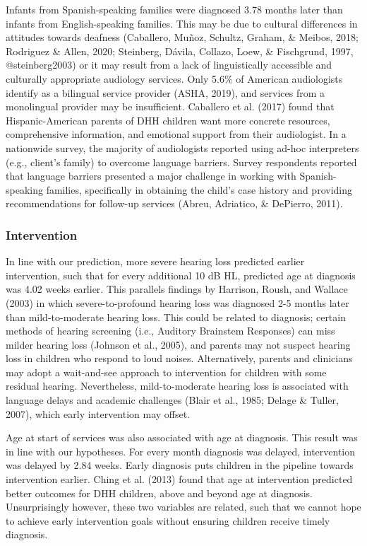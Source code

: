 \documentclass[english,man]{apa6}
\begin{document}
Infants from Spanish-speaking families were diagnosed 3.78 months later than infants from English-speaking families. This may be due to cultural differences in attitudes towards deafness (Caballero, Muñoz, Schultz, Graham, \& Meibos, 2018; Rodriguez \& Allen, 2020; Steinberg, Dávila, Collazo, Loew, \& Fischgrund, 1997, @steinberg2003) or it may result from a lack of linguistically accessible and culturally appropriate audiology services. Only 5.6\% of American audiologists identify as a bilingual service provider (ASHA, 2019), and services from a monolingual provider may be insufficient. Caballero et al. (2017) found that Hispanic-American parents of DHH children want more concrete resources, comprehensive information, and emotional support from their audiologist. In a nationwide survey, the majority of audiologists reported using ad-hoc interpreters (e.g., client's family) to overcome language barriers. Survey respondents reported that language barriers presented a major challenge in working with Spanish-speaking families, specifically in obtaining the child's case history and providing recommendations for follow-up services (Abreu, Adriatico, \& DePierro, 2011).

\hypertarget{intervention}{%
\subsubsection{Intervention}\label{intervention}}

In line with our prediction, more severe hearing loss predicted earlier intervention, such that for every additional 10 dB HL, predicted age at diagnosis was 4.02 weeks earlier. This parallels findings by Harrison, Roush, and Wallace (2003) in which severe-to-profound hearing loss was diagnosed 2-5 months later than mild-to-moderate hearing loss. This could be related to diagnosis; certain methods of hearing screening (i.e., Auditory Brainstem Responses) can miss milder hearing loss (Johnson et al., 2005), and parents may not suspect hearing loss in children who respond to loud noises. Alternatively, parents and clinicians may adopt a wait-and-see approach to intervention for children with some residual hearing. Nevertheless, mild-to-moderate hearing loss is associated with language delays and academic challenges (Blair et al., 1985; Delage \& Tuller, 2007), which early intervention may offset.

Age at start of services was also associated with age at diagnosis. This result was in line with our hypotheses. For every month diagnosis was delayed, intervention was delayed by 2.84 weeks. Early diagnosis puts children in the pipeline towards intervention earlier. Ching et al. (2013) found that age at intervention predicted better outcomes for DHH children, above and beyond age at diagnosis. Unsurprisingly however, these two variables are related, such that we cannot hope to achieve early intervention goals without ensuring children receive timely diagnosis.
\end{document}
